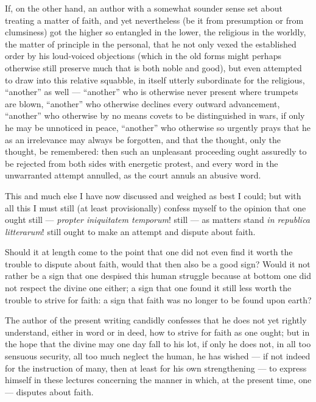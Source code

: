 \documentclass[12pt,a4paper]{book}
\begin{document}
If, on the other hand, an author with a somewhat sounder sense set about
treating a matter of faith, and yet nevertheless (be it from presumption or
from clumsiness) got the higher so entangled in the lower, the religious in the
worldly, the matter of principle in the personal, that he not only vexed the
established order by his loud-voiced objections (which in the old forms might
perhaps otherwise still preserve much that is both noble and good), but even
attempted to draw into this relative squabble, in itself utterly subordinate
for the religious, ``another'' as well --- ``another'' who is otherwise never
present where trumpets are blown, ``another'' who otherwise declines every
outward advancement, ``another'' who otherwise by no means covets to be
distinguished in wars, if only he
may be unnoticed in peace, ``another'' who otherwise so urgently prays that he
as an irrelevance may always be forgotten, and that the thought, only the
thought, be remembered: then such an unpleasant proceeding ought assuredly to
be rejected from both sides with energetic protest, and every word in the
unwarranted attempt annulled, as the court annuls an abusive word.

This and much else I have now discussed and weighed as best I could; but with
all this I must still (at least provisionally) confess myself to the opinion
that one ought still --- \textit{propter iniquitatem temporum}! still --- as
matters stand \textit{in republica litterarum}! still ought to make an attempt
and dispute about faith.

Should it at length come to the point that one did not even find it worth the
trouble to dispute about faith, would that then also be a good sign? Would it
not rather be a sign that one despised this human struggle because at bottom
one did not respect the divine one either; a sign that one found it still less
worth the trouble to strive for faith: a sign that faith was no longer to be
found upon earth?

The author of the present writing candidly confesses that he does not yet
rightly understand, either in word or in deed, how to strive for faith as one
ought; but in the hope that the divine may one day fall to his lot, if only he
does not, in all too sensuous security, all too much neglect the human, he has
wished --- if not indeed for the instruction of many, then at least for his own
strengthening --- to express himself in these lectures concerning the manner in
which, at the present time, one --- disputes about faith.
\end{document}
